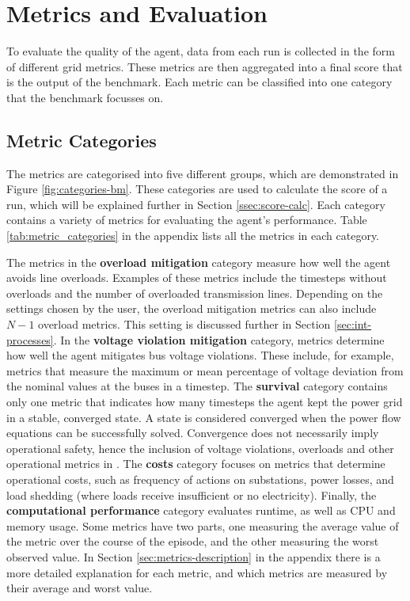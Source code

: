 \section{Metrics and Evaluation}\label{sec:metrics-eval}
To evaluate the quality of the agent, data from each run is collected in the form of different grid metrics. These metrics are then aggregated into a final score that is the output of the benchmark. Each metric can be classified into one category that the benchmark focusses on.

\subsection{Metric Categories}\label{ssec:metric-categories}
The metrics are categorised into five different groups, which are demonstrated in Figure \ref{fig:categories-bm}. These categories are used to calculate the score of a run, which will be explained further in Section \ref{ssec:score-calc}. Each category contains a variety of metrics for evaluating the agent's performance. Table \ref{tab:metric_categories} in the appendix lists all the metrics in each category.

The metrics in the \textbf{overload mitigation} category measure how well the agent avoids line overloads. Examples of these metrics include the timesteps without overloads and the number of overloaded transmission lines. Depending on the settings chosen by the user, the overload mitigation metrics can also include $N-1$ overload metrics. This setting is discussed further in Section \ref{sec:int-processes}.
In the \textbf{voltage violation mitigation} category, metrics determine how well the agent mitigates bus voltage violations. These include, for example, metrics that measure the maximum or mean percentage of voltage deviation from the nominal values at the buses in a timestep. 
The \textbf{survival} category contains only one metric that indicates how many timesteps the agent kept the power grid in a stable, converged state. A state is considered converged when the power flow equations can be successfully solved. Convergence does not necessarily imply operational safety, hence the inclusion of voltage violations, overloads and other operational metrics in \benchmark. 
The \textbf{costs} category focuses on metrics that determine operational costs, such as frequency of actions on substations, power losses, and load shedding (where loads receive insufficient or no electricity). 
Finally, the \textbf{computational performance} category evaluates runtime, as well as CPU and memory usage. Some metrics have two parts, one measuring the average value of the metric over the course of the episode, and the other measuring the worst observed value. In Section \ref{sec:metrics-description} in the appendix there is a more detailed explanation for each metric, and which metrics are measured by their average and worst value. 

